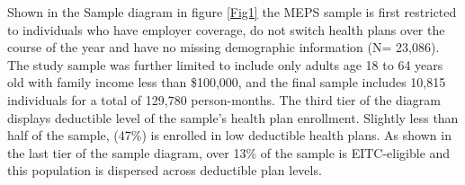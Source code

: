 \documentclass[smallcondensed,referee]{svjour3}
\begin{document}
Shown in the Sample diagram in figure \ref{Fig1} the MEPS sample is first restricted to individuals who have employer coverage, do not switch health plans over the course of the year and have no missing  demographic information (N= 23,086). The study sample was further limited to include only adults age 18 to 64 years old with family income less than \$100,000, and the final sample includes 10,815 individuals for a total of 129,780 person-months.  The third tier of the diagram displays deductible level of the sample's health plan enrollment. Slightly less than half of the sample, (47\%) is enrolled in low deductible health plans. As shown in the last tier of the sample diagram, over 13\% of the sample is EITC-eligible and this population is dispersed across deductible plan levels. 
\end{document}
